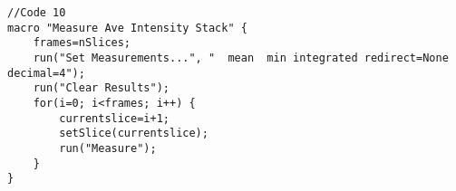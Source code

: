 \begin{lstlisting}[morekeywords={*, run, setSlice, nSlices}]
//Code 10
macro "Measure Ave Intensity Stack" {
	frames=nSlices;
	run("Set Measurements...", "  mean  min integrated redirect=None decimal=4");
	run("Clear Results");
	for(i=0; i<frames; i++) {
		currentslice=i+1;
		setSlice(currentslice);
		run("Measure");
	}
}









\end{lstlisting}